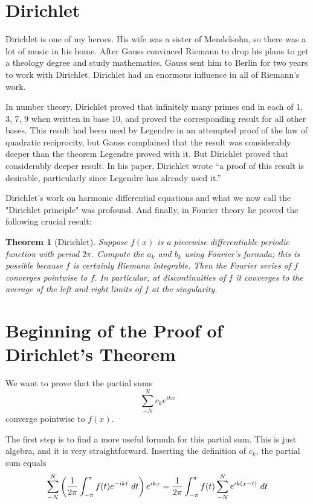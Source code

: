 \documentclass[11pt, oneside]{article}   	%
\newtheorem{theorem}{Theorem}
\begin{document}
\section{Dirichlet}

Dirichlet is one of my heroes. His wife was a sister of Mendelsohn, so there was a lot of music in his home. After Gauss convinced Riemann to drop his plans to get a theology degree and  study mathematics, Gauss  sent him to Berlin for two years to work with Dirichlet. Dirichlet had an enormous influence in all of Riemann's work. 

In number theory, Dirichlet proved that infinitely many primes end in each of 1, 3, 7, 9 when written in base 10, and proved the corresponding result for all other bases. This result had been used by Legendre in an attempted proof of the law of quadratic reciprocity, but Gauss complained that the result was considerably deeper than the theorem Legendre proved with it. But Dirichlet proved that considerably deeper result. In his paper, Dirichlet wrote ``a proof of this result is desirable, particularly since Legendre has already used it.''

Dirichlet's work on harmonic differential equations and what we now call the "Dirichlet principle" was profound. And  finally, in Fourier theory he proved the following crucial result:

\begin{theorem}[Dirichlet]
Suppose $f(x)$ is a piecewise differentiable periodic function with period $2 \pi$. Compute the $a_k$ and $b_k$ using Fourier's formula; this is possible because $f$ is certainly Riemann integrable. Then the Fourier series of $f$ converges pointwise to $f$. In particular, at discontinuities of $f$ it converges to the average of the left and right limits of $f$ at the singularity.
\end{theorem}



\section{Beginning of the Proof of Dirichlet's Theorem}


We want to prove that the partial sums
\[\sum_{-N}^N c_k e^{ikx}\]
converge pointwise to $f(x)$.

The first step is to find a more useful formula for this partial sum. This is just algebra, and it is very straightforward. Inserting the definition of $c_k$, the partial sum equals
\[\sum_{-N}^N \left({1 \over {2 \pi}} \int_{- \pi}^\pi  f(t) e^{-ikt} \ dt\right) e^{ikx} = {1 \over {2 \pi}} \int_{- \pi}^\pi f(t) \sum_{-N}^N e^{i k (x - t)} \ dt\]
\end{document}
